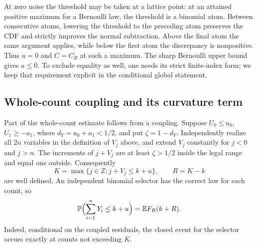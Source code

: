 At zero noise the threshold may be taken at a lattice point: at an attained
positive maximum for a Bernoulli law, the threshold is a binomial atom. Between consecutive atoms, lowering the threshold
to the preceding atom preserves the CDF and strictly improves the normal
subtraction. Above the final atom the same argument applies, while below
the first atom the discrepancy is nonpositive. Thus $u=0$ and $C=C_B$
at such a maximum. The sharp Bernoulli upper bound gives $a\le0$.
To exclude equality as well, one needs its strict finite-index form; we
keep that requirement explicit in the conditional global statement.

\subsection{Whole-count coupling and its curvature term}

Part of the whole-count estimate follows from a coupling. Suppose
$U_0\le a_0$, $U_1\ge-a_1$, where $d_Y=a_0+a_1<1/2$, and put $\zeta=1-d_Y$.
Independently realize all $2n$ variables in the definition of $V_j$ above,
and extend $V_j$ constantly for $j<0$ and $j>n$. The increments of
$j+V_j$ are at least $\zeta>1/2$ inside the legal range and equal one outside.
Consequently
\[
 K=\max\{j\in\mathbb Z:j+V_j\le k+u\},\qquad R=K-k
\]
are well defined. An independent binomial selector has the correct law
for each count, so
\begin{equation}
 \mathbb P\Bigl(\sum_{i=1}^nY_i\le k+u\Bigr)=\mathbb E F_B(k+R).
\label{ms:whole-count-cutoff}
\end{equation}
Indeed, conditional on the coupled residuals, the closed event for the
selector occurs exactly at counts not exceeding $K$.

